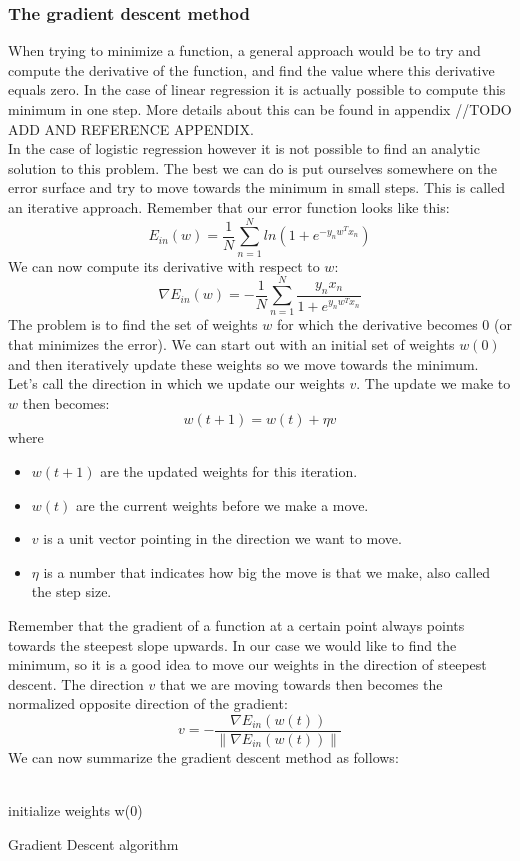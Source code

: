 \subsubsection{The gradient descent method}
When trying to minimize a function, a general approach would be to try and compute the derivative of the function, and find the value where this derivative equals zero. In the case of linear regression it is actually possible to compute this minimum in one step. More details about this can be found in appendix //TODO ADD AND REFERENCE APPENDIX. \\
In the case of logistic regression however it is not possible to find an analytic solution to this problem. The best we can do is put ourselves somewhere on the error surface and try to move towards the minimum in small steps. This is called an iterative approach. Remember that our error function looks like this:
$$
E_{in}(w) = \frac{1}{N}\sum_{n=1}^{N}ln(1+e^{-y_{n}w^{T}x_{n}})
$$
We can now compute its derivative with respect to $w$:
$$
\nabla E_{in}(w) = -\frac{1}{N}\sum_{n=1}^{N}\frac{y_{n}x_{n}}{1+e^{y_{n}w^{T}x_{n}}}
$$
The problem is to find the set of weights $w$ for which the derivative becomes 0 (or that minimizes the error). We can start out with an initial set of weights $w(0)$ and then iteratively update these weights so we move towards the minimum. Let's call the direction in which we update our weights $v$. The update we make to $w$ then becomes:
$$
w(t+1) = w(t) + \eta v
$$
where
\begin{itemize}
	\item $w(t+1)$ are the updated weights for this iteration.
	\item $w(t)$ are the current weights before we make a move.
	\item $v$ is a unit vector pointing in the direction we want to move.
	\item $\eta$ is a number that indicates how big the move is that we make, also called the step size.
\end{itemize}
Remember that the gradient of a function at a certain point always points towards the steepest slope upwards\cite{gradientdirection}\cite{gradientdirection2}. In our case we would like to find the minimum, so it is a good idea to move our weights in the direction of steepest descent. The direction $v$ that we are moving towards then becomes the normalized opposite direction of the gradient:
$$
v = -\frac{\nabla E_{in}(w(t))}{\lVert\nabla E_{in}(w(t))\rVert}
$$
We can now summarize the gradient descent method as follows: \\ \\
\begin{algorithm}[H]
	initialize weights w(0) \\
\caption{Gradient Descent algorithm}
\end{algorithm}

